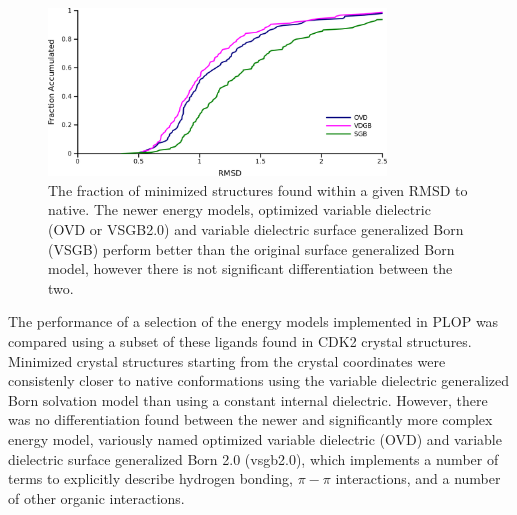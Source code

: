 \begin{figure}[h]
\centering
\includegraphics[width=0.8\textwidth]{figures/small_molecule_minimization.png}
\caption{The fraction of minimized structures found within a given RMSD to native.
The newer energy models, optimized variable dielectric (OVD or VSGB2.0) and variable dielectric surface generalized Born (VSGB) perform better than the original surface generalized Born model, however there is not significant differentiation between the two.}
\label{figure:small_molecule_minimization}
\end{figure}

The performance of a selection of the energy models implemented in PLOP was compared using a subset of these ligands found in CDK2 crystal structures.
Minimized crystal structures starting from the crystal coordinates were consistenly closer to native conformations using the variable dielectric generalized Born solvation model than using a constant internal dielectric.
However, there was no differentiation found between the newer and significantly more complex energy model, variously named optimized variable dielectric (OVD) and variable dielectric surface generalized Born 2.0 (vsgb2.0), which implements a number of terms to explicitly describe hydrogen bonding, $\pi-\pi$ interactions, and a number of other organic interactions.
